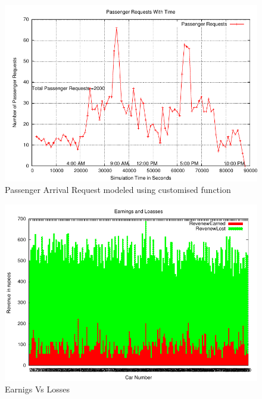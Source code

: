 \documentclass[11pt]{report}
\begin{document}
\begin{figure}[h!t]
\centering
\includegraphics[scale=0.9]{../plots/passengerArrivalDistribution_9AM5PM}
\caption{Passenger Arrival Request modeled using customised function}\label{fig:SVM}
\end{figure}

\begin{figure}[h!t]
\centering
\includegraphics[scale=0.9]{../plots/EarnngsVsLosses}
\caption{Earnigs Vs Losses}\label{fig:SVM}
\end{figure}
\end{document}
